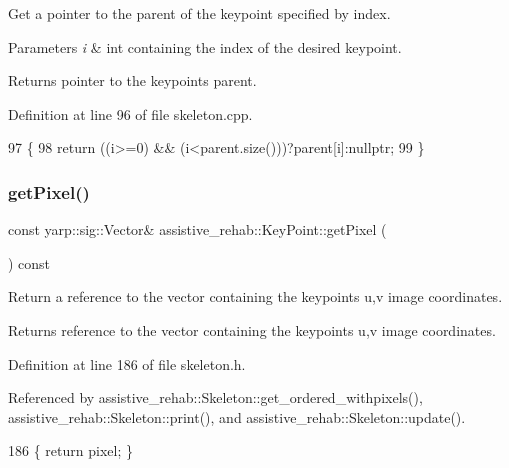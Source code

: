 Get a pointer to the parent of the keypoint specified by index. 


\begin{DoxyParams}{Parameters}
{\em i} & int containing the index of the desired keypoint. \\
\hline
\end{DoxyParams}
\begin{DoxyReturn}{Returns}
pointer to the keypoint\textquotesingle{}s parent. 
\end{DoxyReturn}


Definition at line 96 of file skeleton.\+cpp.


\begin{DoxyCode}
97 \{
98     \textcolor{keywordflow}{return} ((i>=0) && (i<parent.size()))?parent[i]:\textcolor{keyword}{nullptr};
99 \}
\end{DoxyCode}
\mbox{\label{classassistive__rehab_1_1KeyPoint_afebdf9ab021c866f00a2e8a3f9fc4c11}} 
\subsubsection{\texorpdfstring{get\+Pixel()}{getPixel()}}
{\footnotesize\ttfamily const yarp\+::sig\+::\+Vector\& assistive\+\_\+rehab\+::\+Key\+Point\+::get\+Pixel (\begin{DoxyParamCaption}{ }\end{DoxyParamCaption}) const\hspace{0.3cm}{\ttfamily [inline]}}



Return a reference to the vector containing the keypoint\textquotesingle{}s u,v image coordinates. 

\begin{DoxyReturn}{Returns}
reference to the vector containing the keypoint\textquotesingle{}s u,v image coordinates. 
\end{DoxyReturn}


Definition at line 186 of file skeleton.\+h.



Referenced by assistive\+\_\+rehab\+::\+Skeleton\+::get\+\_\+ordered\+\_\+withpixels(), assistive\+\_\+rehab\+::\+Skeleton\+::print(), and assistive\+\_\+rehab\+::\+Skeleton\+::update().


\begin{DoxyCode}
186 \{ \textcolor{keywordflow}{return} pixel; \}
\end{DoxyCode}
\mbox{\label{classassistive__rehab_1_1KeyPoint_a4d68e0824d66f6f0db6dbc176eec3930}} 
